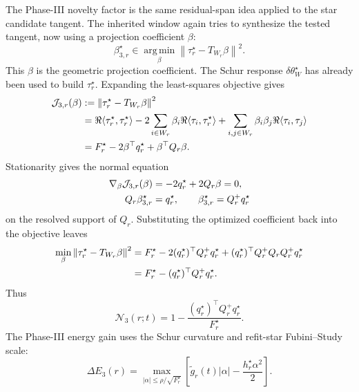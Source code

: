 \documentclass[10pt,twocolumn]{article}
\newcommand{\argmin}{\operatorname*{arg\,min}}
\begin{document}
The Phase-III novelty factor is the same residual-span idea applied to the star candidate tangent. The inherited window again tries to synthesize the tested tangent, now using a projection coefficient \(\beta\):
\begin{equation}
\beta_{3,r}^\star\in
\argmin_\beta
\left\|
\tau_r^\star-T_{W_r}\beta
\right\|^2.
\label{eq:N3_ls_nocedal}
\end{equation}
This \(\beta\) is the geometric projection coefficient. The Schur response \(\delta\theta_W^\star\) has already been used to build \(\tau_r^\star\). Expanding the least-squares objective gives
\begin{align}
\mathcal J_{3,r}(\beta)
&:=
\left\|
\tau_r^\star-T_{W_r}\beta
\right\|^2
\notag\\
&=
\Re\langle\tau_r^\star,\tau_r^\star\rangle
-2\sum_{i\in W_r}\beta_i\Re\langle\tau_i,\tau_r^\star\rangle
+\sum_{i,j\in W_r}\beta_i\beta_j\Re\langle\tau_i,\tau_j\rangle
\notag\\
&=F_r^\star-2\beta^\top q_r^\star+\beta^\top Q_r\beta .
\label{eq:N3_expand_nocedal}
\end{align}
Stationarity gives the normal equation
\begin{align}
\nabla_\beta\mathcal J_{3,r}(\beta)
&=-2q_r^\star+2Q_r\beta=0,
\notag\\
Q_r\beta_{3,r}^\star&=q_r^\star,
\qquad
\beta_{3,r}^\star=Q_r^+q_r^\star
\label{eq:N3_normal_nocedal}
\end{align}
on the resolved support of \(Q_r\).
Substituting the optimized coefficient back into the objective leaves
\begin{align}
\min_\beta
\left\|
\tau_r^\star-T_{W_r}\beta
\right\|^2
&=
F_r^\star
-2(q_r^\star)^\top Q_r^+q_r^\star
+(q_r^\star)^\top Q_r^+Q_rQ_r^+q_r^\star
\notag\\
&=F_r^\star-(q_r^\star)^\top Q_r^+q_r^\star.
\label{eq:N3_residual_nocedal}
\end{align}
Thus
\begin{equation}
\boxed{
\mathcal N_3(r;t)
=1-\frac{(q_r^\star)^\top Q_r^+q_r^\star}
{F_r^\star}.
}
\label{eq:N3_paper}
\end{equation}
The Phase-III energy gain uses the Schur curvature and refit-star Fubini--Study scale:
\begin{equation}
\boxed{
\Delta E_3(r)
=
\max_{|\alpha|\le \rho/\sqrt{F_r^\star}}
\left[
\widetilde g_r(t)|\alpha|
-\frac{h_r^\star\alpha^2}{2}
\right].
}
\label{eq:phase3_gain_paper}
\end{equation}
\end{document}
